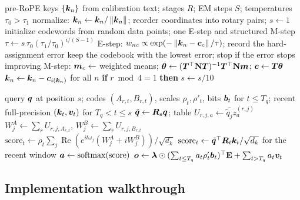 \begin{algorithm}[t]
\caption{Training one stage-wise residual key codebook (one layer, one head), as in \texttt{quantize\_key\_cache.py}}
\label{alg:c13-commvq-em}
\begin{algorithmic}[1]
\Require pre-RoPE keys $\{\bm{k}_n\}$ from calibration text; stages $R$; EM steps $S$; temperatures $\tau_0>\tau_1$
\State normalize: $\bm{k}_n\gets\bm{k}_n/\left\lVert \bm{k}_n\right\rVert$; reorder coordinates into rotary pairs; $s\gets1$
  \State initialize codewords from random data points; one E-step and structured M-step
    \State $\tau\gets s\,\tau_0(\tau_1/\tau_0)^{i/(S-1)}$ 
    \State E-step: $w_{nc}\propto\exp(-\left\lVert \bm{k}_n-\bm{c}_c\right\rVert/\tau)$; record the hard-assignment error
    \State keep the codebook with the lowest error; stop if the error stops improving
    \State M-step: $\bm{m}_c\gets$ weighted means; $\bm{\theta}\gets(\bm{T}^{\top}\mathbf{N}\bm{T})^{-1}\bm{T}^{\top}\mathbf{N}\bm{m}$; $\bm{c}\gets\bm{T}\bm{\theta}$
  \EndFor
  \State $\bm{k}_n\gets\bm{k}_n-\bm{c}_{i(\bm{k}_n)}$ for all $n$ 
  \State \textbf{if} $r\bmod 4=1$ \textbf{then} $s\gets s/10$
\EndFor
\end{algorithmic}
\end{algorithm}

\begin{algorithm}[t]
\caption{One decoding step of attention over a CommVQ cache (one query head)}
\label{alg:c13-commvq-decode}
\begin{algorithmic}[1]
\Require query $\bm{q}$ at position $s$; codes $(A_{r,t},B_{r,t})$, scales $\rho_t,\rho'_t$, bits $\bm{b}_t$ for $t\le T_q$; recent full-precision $(\bm{k}_t,\bm{v}_t)$ for $T_q<t\le s$
\State $\tilde{\bm{q}}\gets\bm{R}_s\bm{q}$; table $U_{r,j,a}\gets\overline{\tilde q_j}z^{(r,j)}_a$ 
 
  \State $W^A_j\gets\sum_rU_{r,j,A_{r,t}}$, $W^B_j\gets\sum_rU_{r,j,B_{r,t}}$
  \State $\text{score}_t\gets\rho_t\sum_j\operatorname{Re}(e^{it\omega_j}(W^A_j+iW^B_j))/\sqrt{d_k}$
\EndFor
\State $\text{score}_t\gets\tilde{\bm{q}}^{\top}\bm{R}_t\bm{k}_t/\sqrt{d_k}$ for the recent window
\State $\bm{a}\gets\operatorname{softmax}(\text{score})$
\State $\bm{o}\gets\bm{\lambda}\odot(\sum_{t\le T_q}a_t\rho'_t\bm{b}_t)^{\top}\mathbf{E}+\sum_{t>T_q}a_t\bm{v}_t$
\end{algorithmic}
\end{algorithm}

\subsection{Implementation walkthrough}\label{sec:c13-commvq-impl}

